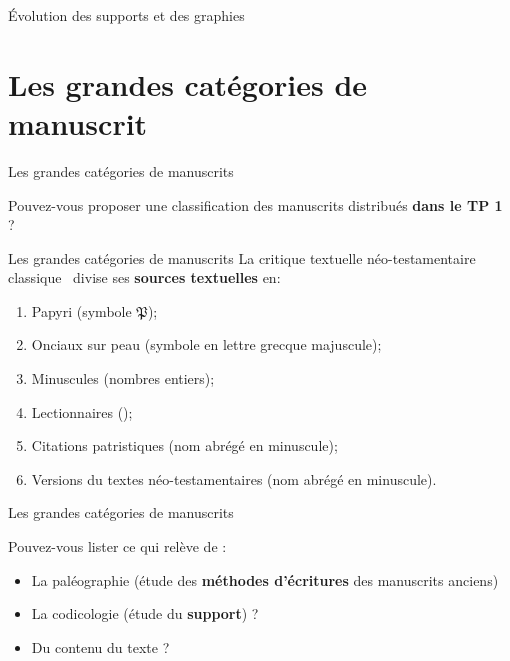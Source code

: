 \documentclass[11pt]{beamer}
\begin{document}
\begin{frame}{Évolution des supports et des graphies}
\end{frame}

\section{Les grandes catégories de manuscrit}

\begin{frame}{Les grandes catégories de manuscrits}
\begin{block}{}
    Pouvez-vous proposer une classification des manuscrits distribués \textbf{dans le TP 1 }?
\end{block}
\end{frame}

\begin{frame}{Les grandes catégories de manuscrits}
    La critique textuelle néo-testamentaire \og classique \fg\ divise ses \textbf{sources textuelles} en:
    \begin{enumerate}
        \item Papyri (symbole $\mathfrak{P}$);
        \item Onciaux sur peau (symbole en lettre grecque majuscule);
        \item Minuscules (nombres entiers);
        \item Lectionnaires ();
        \item Citations patristiques (nom abrégé en minuscule);
        \item Versions du textes néo-testamentaires (nom abrégé en minuscule).
    \end{enumerate}
\end{frame}


\begin{frame}{Les grandes catégories de manuscrits}
    \begin{alertblock}{}
        Pouvez-vous lister ce qui relève de : 
        \begin{itemize}
            \item La paléographie (étude des \textbf{méthodes d'écritures} des manuscrits anciens)
            \item La codicologie (étude du \textbf{support}) ?
            \item Du contenu du texte ?
        \end{itemize}
    \end{alertblock}
\end{frame}
\end{document}
